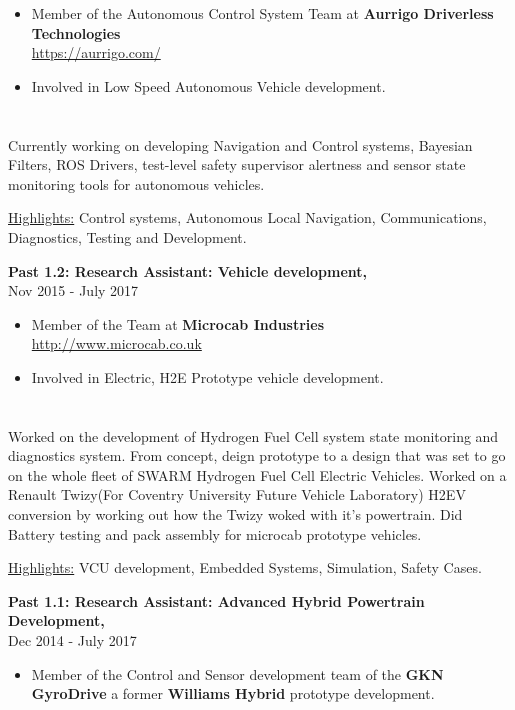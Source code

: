 \documentclass[margin]{res}
\begin{document}
\begin{resume}
\begin{itemize} \itemsep -2pt  
\item Member of the Autonomous Control System Team at {\bf Aurrigo Driverless Technologies}\\
\url{https://aurrigo.com/}
\item Involved in Low Speed Autonomous Vehicle development.
\end{itemize}
\section{}
Currently working on developing Navigation and Control systems, Bayesian Filters, ROS Drivers, test-level safety supervisor alertness and sensor state  monitoring tools for autonomous vehicles.    

\underline{Highlights:} Control systems, Autonomous Local Navigation, Communications, Diagnostics, Testing and Development. 

{\bf Past 1.2: Research Assistant: {\bf Vehicle development},}
\\ 
\hfill  Nov 2015 - July 2017

\begin{itemize} \itemsep -2pt  %
\item Member of the Team at {\bf Microcab Industries}\\
\url{http://www.microcab.co.uk}
\item Involved in Electric, H2E Prototype vehicle development.
\end{itemize}
\section{}
Worked on the development of Hydrogen Fuel Cell system state monitoring and diagnostics system. From concept, deign prototype to a design that was set to go on the whole fleet of SWARM 
Hydrogen Fuel Cell Electric Vehicles. Worked on a Renault Twizy(For Coventry University Future Vehicle Laboratory) H2EV conversion by working out how the Twizy woked with it's powertrain. Did Battery testing and pack assembly for microcab prototype vehicles. 

\underline{Highlights:} VCU development, Embedded Systems, Simulation, Safety
Cases.


{\bf Past 1.1: Research Assistant: {\bf Advanced Hybrid Powertrain
Development},}
\\ 
\hfill  Dec 2014 - July 2017
\begin{itemize} \itemsep -2pt  %
\item Member of the Control and Sensor development team of the {\bf GKN
GyroDrive} a former {\bf Williams Hybrid} prototype development.
\end{itemize}



\end{resume}
\end{document}
